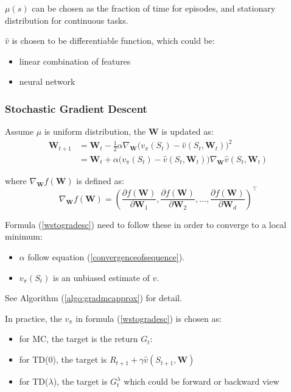 $\mu(s)$ can be chosen as the fraction of time for episodes, and stationary distribution for continuous tasks.

$\widehat{v}$ is chosen to be differentiable function, which could be:
\begin{itemize}
	\item linear combination of features
	\item neural network
\end{itemize}

\subsubsection{Stochastic Gradient Descent}

Assume $\mu$ is uniform distribution, the $\mathbf{W}$ is updated as:
\begin{equation}\label{wstogradesc}
	\begin{aligned}
		\mathbf{W}_{t+1} &= \mathbf{W}_t - \frac{1}{2} \alpha \nabla_{\mathbf{W}} \Big ( v_\pi(S_t) - \widehat{v}(S_t, \mathbf{W}_t) \Big )^2 \\
		&= \mathbf{W}_t+ \alpha \Big ( v_\pi(S_t) - \widehat{v}(S_t, \mathbf{W}_t) \Big ) \nabla_{\mathbf{W}}  \widehat{v}(S_t, \mathbf{W}_t) 
	\end{aligned}
\end{equation}

where $\nabla_{\mathbf{W}} f(\mathbf{W})$ is defined as:
\begin{equation}
	\nabla_{\mathbf{W}} f(\mathbf{W}) = \left( \frac{\partial f(\mathbf{W})}{\partial \mathbf{W}_1}, \frac{\partial f(\mathbf{W})}{\partial \mathbf{W}_2}, \dots, \frac{\partial f(\mathbf{W})}{\partial \mathbf{W}_d}  \right)^{\top}
\end{equation}

 Formula (\ref{wstogradesc}) need to follow these in order to converge to a local minimum:
\begin{itemize}
	\item $\alpha$ follow equation (\ref{convergenceofsequence}).
	\item $v_\pi(S_t) $ is an unbiased estimate of $v$.
\end{itemize}




See Algorithm (\ref{algo:gradmcapprox}) for detail.

In practice, the $v_\pi$ in formula (\ref{wstogradesc}) is chosen as:
\begin{itemize}
	\item for MC, the target is the return $G_t$:
	\item for TD(0), the target is $R_{t+1} + \gamma \widehat{v}(S_{t+1}, \mathbf{W} )$
	\item for TD($\lambda$), the target is $G_t^\lambda$ which could be forward or backward view
\end{itemize}



